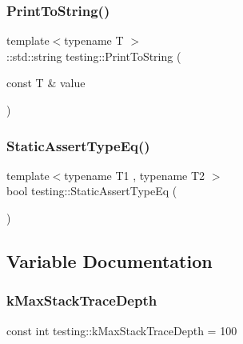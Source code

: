 \mbox{\label{namespacetesting_aa5717bb1144edd1d262d310ba70c82ed}} 
\subsubsection{\texorpdfstring{PrintToString()}{PrintToString()}}
{\footnotesize\ttfamily template$<$typename T $>$ \\
\+::std\+::string testing\+::\+Print\+To\+String (\begin{DoxyParamCaption}\item[{const T \&}]{value }\end{DoxyParamCaption})}

\mbox{\label{namespacetesting_a661e70fc6afeb5c085eed3716aa45059}} 
\subsubsection{\texorpdfstring{StaticAssertTypeEq()}{StaticAssertTypeEq()}}
{\footnotesize\ttfamily template$<$typename T1 , typename T2 $>$ \\
bool testing\+::\+Static\+Assert\+Type\+Eq (\begin{DoxyParamCaption}{ }\end{DoxyParamCaption})}



\subsection{Variable Documentation}
\mbox{\label{namespacetesting_ae605f2ccac04616bb7812ca72e517082}} 
\subsubsection{\texorpdfstring{kMaxStackTraceDepth}{kMaxStackTraceDepth}}
{\footnotesize\ttfamily const int testing\+::k\+Max\+Stack\+Trace\+Depth = 100}

